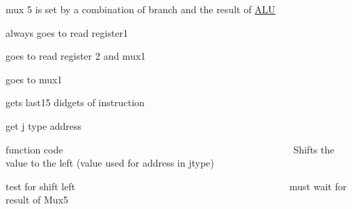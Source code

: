 mux 5 is set by a combination of branch and the result of \mbox{\hyperlink{class_a_l_u}{A\+LU}}

always goes to read register1

goes to read register 2 and mux1

goes to mux1

gets last15 didgets of instruction

get j type address

function code ~\newline
~\newline
~\newline
~\newline
~\newline
~\newline
~\newline
~\newline
~\newline
~\newline
~\newline
~\newline
~\newline
~\newline
~\newline
~\newline
~\newline
~\newline
~\newline
~\newline
~\newline
~\newline
~\newline
~\newline
~\newline
~\newline
~\newline
~\newline
 Shifts the value to the left (value used for address in jtype)

test for shift left ~\newline
~\newline
~\newline
~\newline
~\newline
~\newline
~\newline
~\newline
~\newline
~\newline
~\newline
~\newline
~\newline
~\newline
~\newline
~\newline
~\newline
~\newline
~\newline
~\newline
~\newline
~\newline
~\newline
~\newline
~\newline
~\newline
 must wait for result of Mux5

